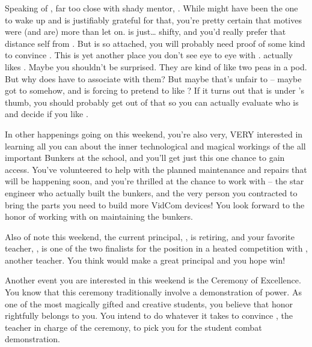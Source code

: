 \documentclass[char]{GL2020}
\begin{document}
Speaking of \cDisney{}, \cDisney{\theyare} far too close with \cDisney{\their} shady mentor, \cWildCard{}. While \cWildCard{} might have been the one to wake \cDisney{} up and \cDisney{\they} is justifiably grateful for that, you're pretty certain that \cWildCard{\their} motives were (and are) more than \cWildCard{\they} let\cWildCard{\plural} on. \cWildCard{} is just\ldots{} shifty, and you'd really prefer that \cDisney{} distance \cDisney{\them}self from \cWildCard{\them}. But \cDisney{} is so attached, you will probably need proof of some kind to convince \cDisney{\them}. This is yet another place you don't see eye to eye with \cPirateChild{}. \cPirateChild{} actually likes \cWildCard{}. Maybe you shouldn't be surprised. They are kind of like two peas in a pod. But why does \cDisney{} have to associate with them? But maybe that's unfair to \cPirateChild{} – maybe \cWildCard{} got to \cPirateChild{\them} somehow, and is forcing \cPirateChild{\them} to pretend to like \cWildCard{\them}? If it turns out that \cPirateChild{} is under \cWildCard{}'s thumb, you should probably get \cPirateChild{\them} out of that so you can actually evaluate who \cPirateChild{\they} is and decide if you like \cPirateChild{\them}.

In other happenings going on this weekend, you're also very, VERY interested in learning all you can about the inner technological and magical workings of the all important Bunkers at the school, and you'll get just this one chance to gain access. You've volunteered to help with the planned maintenance and repairs that will be happening soon, and you're thrilled at the chance to work with \cBunker{} – the star engineer who actually built the bunkers, and the very person you contracted to bring the parts you need to build more VidCom devices! You look forward to the honor of working with \cBunker{} on maintaining the bunkers.

Also of note this weekend, the current principal, \cPrincipal{\full}, is retiring, and your favorite teacher, \cBeetle{\full}, is one of the two finalists for the position in a heated competition with \cMusic{\full}, another teacher. You think \cBeetle{} would make a great principal and you hope \cBeetle{\they} win\cBeetle{\plural}!

Another event you are interested in this weekend is the Ceremony of Excellence. You know that this ceremony traditionally involve a demonstration of power. As one of the most magically gifted and creative students, you believe that honor rightfully belongs to you. You intend to do whatever it takes to convince \cMusic{}, the teacher in charge of the ceremony, to pick you for the student combat demonstration.
\end{document}
